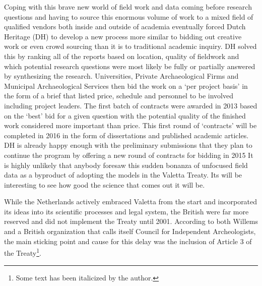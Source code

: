 \documentclass[spanish]{ijsra}
\begin{document}
Coping with this brave new world of field work and data coming before research questions and having to source this enormous volume of work to a mixed field of qualified vendors both inside and outside of academia eventually forced Dutch Heritage (DH) to develop a new process more similar to bidding out creative work or even crowd sourcing than it is to traditional academic inquiry. DH solved this by ranking all of the reports based on location, quality of fieldwork and which potential research questions were most likely be fully or partially answered by synthesizing the research. Universities, Private Archaeological Firms and Municipal Archaeological Services then bid the work on a ‘per project basis’ in the form of a brief that listed price, schedule and personnel to be involved including project leaders. The first batch of contracts were awarded in 2013 based on the ‘best’ bid for a given question with the potential quality of the finished work considered more important than price. This first round of ‘contracts’ will be completed in 2016 in the form of dissertations and published academic articles. DH is already happy enough with the preliminary submissions that they plan to continue the program by offering a new round of contracts for bidding in 2015 %
It is highly unlikely that anybody foresaw this sudden bonanza of unfocused field data as a byproduct of adopting the models in the Valetta Treaty. Its will be interesting to see how good the science that comes out it will be. 

While the Netherlands actively embraced Valetta from the start and incorporated its ideas into its scientific processes and legal system, the British were far more reserved and did not implement the Treaty until 2001. According to both Willems and a British organization that calls itself Council for Independent Archeologists, the main sticking point and cause for this delay was the inclusion of Article 3 of the Treaty\footnote{Some text has been italicized by the author.}.
\end{document}
